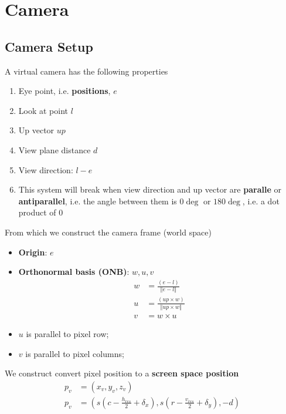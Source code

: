 \chapter{Camera}

\section{Camera Setup}

  A virtual camera has the following properties

  \begin{enumerate}
    \item Eye point, i.e. \textbf{positions}, $ e $
    \item Look at point $ l $
    \item Up vector $ up $
    \item View plane distance $ d $
    \item View direction: $ l - e $
    \item This system will break when view direction and up vector are
    \textbf{paralle} or \textbf{antiparallel}, i.e. the angle between them is
    $ 0\deg $ or $ 180\deg $, i.e. a dot product of $ 0 $
  \end{enumerate}

  From which we construct the camera frame (world space)
  \begin{itemize}
    \item \textbf{Origin}: $ e $
    \item \textbf{Orthonormal basis (ONB)}: $ w, u, v $
    \begin{align}
      w &= \frac{\left( e - l \right)}{\left\Vert e - l \right\Vert} \\
      u &= \frac{\left( up \times w \right)}{\left\Vert up \times w \right\Vert} \\
      v &= w \times u
    \end{align}

    \item $ u $ is parallel to pixel row;
    \item $ v $ is parallel to pixel columns;
  \end{itemize}

  We construct convert pixel position to a
  \textbf{screen space position}
  \begin{align}
    p_{v} &= \left( x_{v}, y_{v}, z_{v} \right) \\
    p_{v} &=
    \left(
      s\left( c - \frac{h_{res}}{2} + \delta_{x} \right),
      s\left( r - \frac{v_{res}}{2} + \delta_{y} \right),
      -d
    \right)
  \end{align}


